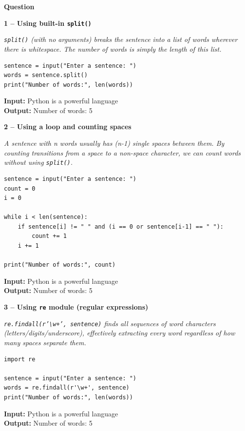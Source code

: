 \documentclass[12pt]{article}
\newenvironment{qbox}[1]{\par\bigskip\noindent\textbf{#1}\par}{\par\medskip}
\newcommand{\1}{Question}
\newcommand{\method}[1]{\par\medskip\noindent\textbf{#1}\par}
\newcommand{\logicbox}[1]{\par\smallskip\noindent\textit{#1}\par}
\newcommand{\inout}[2]{\par\smallskip\noindent\textbf{Input:} #1\\\textbf{Output:} #2\par}
\begin{document}
\begin{qbox}{\1}

\method{1 -- Using built-in \texttt{split()}}
\logicbox{\texttt{split()} (with no arguments) breaks the sentence into a list of words wherever there is whitespace. The number of words is simply the length of this list.}
\begin{lstlisting}
sentence = input("Enter a sentence: ")
words = sentence.split()
print("Number of words:", len(words))
\end{lstlisting}
\inout{Python is a powerful language}{Number of words: 5}

\method{2 -- Using a loop and counting spaces}
\logicbox{A sentence with n words usually has (n-1) single spaces between them. By counting transitions from a space to a non-space character, we can count words without using \texttt{split()}.}
\begin{lstlisting}
sentence = input("Enter a sentence: ")
count = 0
i = 0

while i < len(sentence):
    if sentence[i] != " " and (i == 0 or sentence[i-1] == " "):
        count += 1
    i += 1

print("Number of words:", count)
\end{lstlisting}
\inout{Python is a powerful language}{Number of words: 5}

\method{3 -- Using \texttt{re} module (regular expressions)}
\logicbox{\texttt{re.findall(r'\textbackslash w+', sentence)} finds all sequences of word characters (letters/digits/underscore), effectively extracting every word regardless of how many spaces separate them.}
\begin{lstlisting}
import re

sentence = input("Enter a sentence: ")
words = re.findall(r'\w+', sentence)
print("Number of words:", len(words))
\end{lstlisting}
\inout{Python is a powerful language}{Number of words: 5}
\end{qbox}
\end{document}
